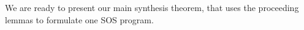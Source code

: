 \documentclass[journal,twoside,web]{ieeecolor}
\newcommand{\unsafe}{\mathrm{u}}
\newcommand{\safe}{\mathrm{s}}
\newcommand{\reach}{\mathrm{r}}
\newcommand{\initial}{\mathrm{0}}
\newcommand{\reals}{\mathbb{R}}
\newcommand{\naturals}{\mathbb{N}}
\newcommand{\hor}{H}
\newcommand{\RA}{\mathcal{R}}
\theoremstyle{definition}
\theoremstyle{plain}
\newtheorem{theorem}{Theorem}
\theoremstyle{plain}
\begin{document}
We are ready to present our main synthesis theorem, that uses the proceeding lemmas to formulate one SOS program.

\end{document}

